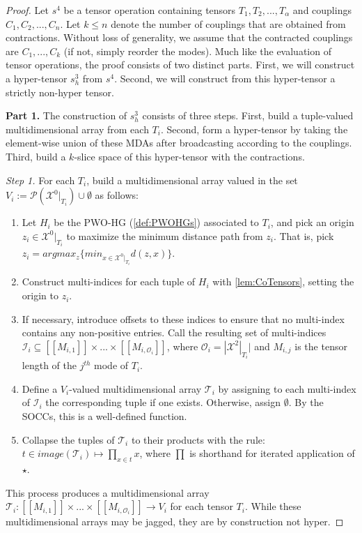 \documentclass{article}
\theoremstyle{plain}
\theoremstyle{definition}
\theoremstyle{remark}
\newcommand{\cX}{\mathcal{X}}
\newcommand{\cO}{\mathcal{O}}
\newcommand{\cP}{\mathcal{P}}
\newcommand{\cI}{\mathcal{I}}
\newcommand{\cT}{\mathcal{T}}
\begin{document}
\begin{proof}
	Let $s^4$ be a tensor operation containing tensors $T_1, T_2, ..., T_{\alpha}$ and couplings $C_1, C_2, ..., C_n$. Let $k \leq n$ denote the number of couplings that are obtained from contractions. Without loss of generality, we assume that the contracted couplings are $C_1, ..., C_k$ (if not, simply reorder the modes). Much like the evaluation of tensor operations, the proof consists of two distinct parts. First, we will construct a hyper-tensor $s^3_h$ from $s^4$. Second, we will construct from this hyper-tensor a strictly non-hyper tensor.
	
	\textbf{Part 1.}
	The construction of $s^3_h$ consists of three steps. First, build a tuple-valued multidimensional array from each $T_i$. Second, form a hyper-tensor by taking the element-wise union of these MDAs after broadcasting according to the couplings. Third, build a $k$-slice space of this hyper-tensor with the contractions.
	
	\textit{Step 1.} For each $T_i$, build a multidimensional array valued in the set $V_i := \cP(\cX^0|_{T_i}) \cup \emptyset$ as follows:
	\begin{enumerate}
		\item Let $H_i$ be the PWO-HG (\cref{def:PWOHGs}) associated to $T_i$, and pick an origin $z_i \in \cX^0|_{T_i}$ to maximize the minimum distance path from $z_i$. That is, pick $z_i = argmax_{z} \big\{ min_{x \in \cX^0|_{T_i}} d(z, x) \big\}$.
		\item Construct multi-indices for each tuple of $H_i$ with \cref{lem:CoTensors}, setting the origin to $z_i$. 
		\item If necessary, introduce offsets to these indices to ensure that no multi-index contains any non-positive entries. Call the resulting set of multi-indices $\cI_i \subseteq [[M_{i,1}]] \times ... \times [[M_{i,\cO_i}]]$, where $\cO_i = |\cX^2|_{T_i}|$ and $M_{i,j}$ is the tensor length of the $j^{th}$ mode of $T_i$.
		\item Define a $V_i$-valued multidimensional array $\cT_i$ by assigning to each multi-index of $\cI_i$ the corresponding tuple if one exists. Otherwise, assign $\emptyset$. By the SOCCs, this is a well-defined function.
		\item Collapse the tuples of $\cT_i$ to their products with the rule: $t \in image(\cT_i) \mapsto \prod_{x \in t} x$, where $\prod$ is shorthand for iterated application of $\star$.
	\end{enumerate}
	This process produces a multidimensional array $\cT_i: [[M_{i,1}]] \times ... \times [[M_{i,\cO_i}]] \rightarrow V_i$ for each tensor $T_i$. While these multidimensional arrays may be jagged, they are by construction not hyper.
	

\end{proof}
\end{document}
